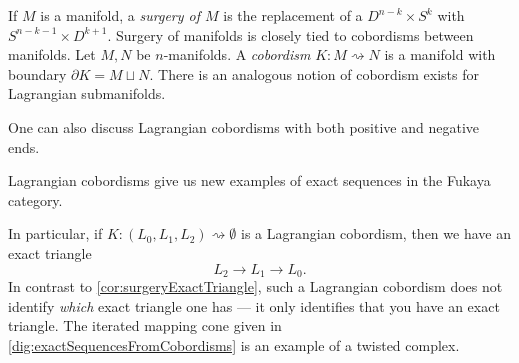 
If $M$ is a manifold, a \emph{surgery of $M$} is the replacement of a $D^{n-k}\times S^k$ with $S^{n-k-1}\times D^{k+1}$. 
Surgery of manifolds is closely tied to cobordisms between manifolds. 
Let $M, N$ be $n$-manifolds. 
A \emph{cobordism} $K: M\rightsquigarrow N$ is a manifold with boundary $\partial K=M\sqcup N$. 
There is an analogous notion of cobordism exists for Lagrangian submanifolds.

One can also discuss Lagrangian cobordisms with both positive and negative ends.



Lagrangian cobordisms give us new examples of exact sequences in the Fukaya category. 

In particular, if $K: (L_0, L_1, L_2)\rightsquigarrow \emptyset$ is a Lagrangian cobordism, then we have an exact triangle
\[L_2\to L_1\to L_0.\]
In contrast to \cref{cor:surgeryExactTriangle}, such a Lagrangian cobordism does not identify \emph{which} exact triangle one has --- it only identifies that you have an exact triangle. 
The iterated mapping cone given in \cref{dig:exactSequencesFromCobordisms} is an example of a twisted complex.